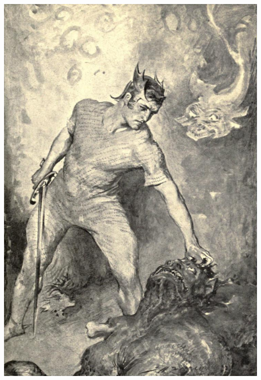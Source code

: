 \documentclass[aspectratio=169]{beamer}
\begin{document}
\begin{frame}[fragile]
\begin{columns}
  \includegraphics[width=\linewidth]{Beowulf}
\column{2cm}
\end{columns}
\end{frame}
\end{document}

